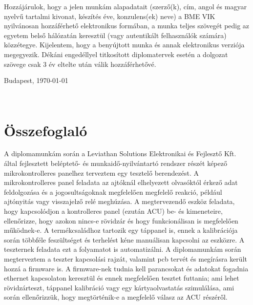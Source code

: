 \documentclass[a4paper, 12pt]{article}
\begin{document}
Hozzájárulok, hogy a jelen munkám alapadatait (szerző(k), cím, angol és magyar nyelvű tartalmi kivonat, készítés éve, konzulens(ek) neve) a BME VIK nyilvánosan hozzáférhető elektronikus formában, a munka teljes szövegét pedig az egyetem belső hálózatán keresztül (vagy autentikált felhasználók számára) közzétegye. Kijelentem, hogy a benyújtott munka és annak elektronikus verziója megegyezik. Dékáni engedéllyel titkosított diplomatervek esetén a dolgozat szövege csak 3 év eltelte után válik hozzáférhetővé.

\begin{flushleft}
\vspace*{1cm}
Budapest, \today
\end{flushleft}

\begin{flushright}
 \vspace*{1cm}
 \makebox[7cm]{\rule{6cm}{.4pt}}\\
\end{flushright}


\thispagestyle{empty} %
\vfill
\clearpage

\section*{Összefoglaló}
A diplomamunkám során a Leviathan Solutions Elektronikai és Fejlesztő Kft. által fejlesztett beléptető- és munkaidő-nyilvántartó rendszer részét képező mikrokontrolleres panelhez terveztem egy tesztelő berendezést. A mikrokontrolleres panel feladata az ajtóknál elhelyezett olvasóktól érkező adat feldolgozása és a jogosultságoknak megfelelően megfelelő reakció, például ajtónyitás vagy visszajelző relé meghúzása. A megtervezendő eszköz feladata, hogy kapcsolódjon a kontrolleres panel (ezután ACU) be- és kimeneteire, ellenőrizze, hogy azokon nincs-e rövidzár és hogy funkcionálisan is megfelelően működnek-e. A termékcsaládhoz tartozik egy táppanel is, ennek a kalibrációja során többféle feszültséget és terhelést kéne manuálisan kapcsolni az eszközre. A teszternek feladata ezt a folyamatot is automatizálni. A diplomamunkám során megterveztem a teszter kapcsolási rajzát, valamint pcb tervét és megírásra került hozzá a firmware is. A firmware-nek tudnia kell parancsokat és adatokat fogadnia ethernet kapcsolaton keresztül és ennek megfelelően tesztet futtania; ami lehet rövidzárteszt, táppanel kalibráció vagy egy kártyaolvastatás szimulálása, ami során ellenőrizzük, hogy megtörténik-e a megfelelő válasz az ACU részéről. 
\end{document}
